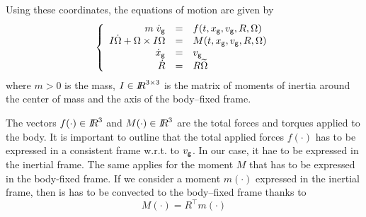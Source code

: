Using these coordinates, the equations of motion are given by 
\begin{equation}
  \label{eq:motion-NewtonEuler}
  \left\{\begin{array}{rcl}
      m \;\dot v_{\sf \small g}  & = &f(t,x_{\sf \small g}, v_{\sf \small g},  R,  \Omega) \\
      I \dot \Omega + \Omega \times I \Omega &= & M(t,x_{\sf \small g}, v_{\sf \small g}, R, \Omega) \\
      \dot x_{\sf \small g}&=& v_{\sf \small g}\\
      \dot R  &=& R \widetilde \Omega
    \end{array}
  \right.
\end{equation}
where $m> 0$ is the mass, $I\in \mbox{\rm $I\!\!R$}^{3\times 3}$ is the matrix of moments of inertia around the center of mass and the axis of the body--fixed frame.

The vectors $f(\cdot)\in \mbox{\rm $I\!\!R$}^3$ and $M(\cdot)\in \mbox{\rm $I\!\!R$}^3$ are the total forces and torques applied to the body. It is important to outline that the total applied forces $f(\cdot)$ has to be expressed in a consistent frame w.r.t. to $v_{\sf \small g}$. In our case, it hae to be expressed in the inertial frame. The same applies for the moment $M$ that has to be expressed in the body-fixed frame. If we consider a moment $m(\cdot)$ expressed in the inertial frame, then is has to be convected to  the body--fixed frame thanks to
\begin{equation}
  \label{eq:convected_moment}
  M (\cdot) =R^\top  m (\cdot)
\end{equation}



